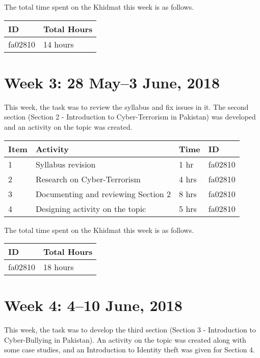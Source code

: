 \documentclass{article}
\begin{document}
The total time spent on the Khidmat this week is as follows. \newline

\begin{tabular}{|l|l|}
  \hline
  ID & Total Hours\\\hline\hline
  fa02810 & 14 hours\\\hline
\end{tabular}

\newpage %
\section*{Week 3: 28 May--3 June, 2018}

This week, the task was to review the syllabus and fix issues in it. The second section (Section 2 - Introduction to Cyber-Terrorism in Pakistan) was developed and an activity on the topic was created. \newline

\begin{tabular}{|l|l|l|l|}
  \hline
  Item 	& Activity & Time & ID \\\hline\hline
  1	& Syllabus revision & 1 hr & fa02810 \\\hline
  2	& Research on Cyber-Terrorism & 4 hrs & fa02810 \\\hline
  3	& Documenting and reviewing Section 2 & 8 hrs & fa02810 \\\hline
  4 & Designing activity on the topic & 5 hrs & fa02810 \\\hline
\end{tabular} \newline

The total time spent on the Khidmat this week is as follows. \newline

\begin{tabular}{|l|l|}
  \hline
  ID & Total Hours\\\hline\hline
  fa02810 & 18 hours\\\hline
\end{tabular}

\newpage %
\section*{Week 4: 4--10 June, 2018}

This week, the task was to develop the third section (Section 3 - Introduction to Cyber-Bullying in Pakistan). An activity on the topic was created along with some case studies, and an Introduction to Identity theft was given for Section 4.  \newline
\end{document}
